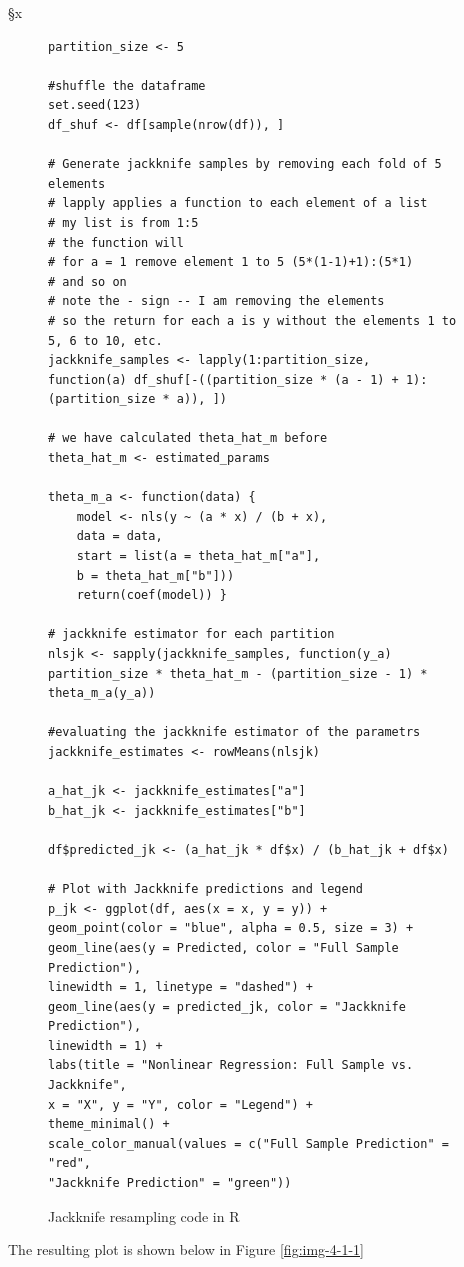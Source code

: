 §x\documentclass[]{article}
\begin{document}
\begin{figure}[H]
	\captionsetup{type=lstlisting}
	\begin{lstlisting}
partition_size <- 5

#shuffle the dataframe
set.seed(123)
df_shuf <- df[sample(nrow(df)), ]

# Generate jackknife samples by removing each fold of 5 elements
# lapply applies a function to each element of a list
# my list is from 1:5
# the function will
# for a = 1 remove element 1 to 5 (5*(1-1)+1):(5*1)
# and so on
# note the - sign -- I am removing the elements
# so the return for each a is y without the elements 1 to 5, 6 to 10, etc.
jackknife_samples <- lapply(1:partition_size,
function(a) df_shuf[-((partition_size * (a - 1) + 1):(partition_size * a)), ])

# we have calculated theta_hat_m before
theta_hat_m <- estimated_params

theta_m_a <- function(data) {
	model <- nls(y ~ (a * x) / (b + x),
	data = data,
	start = list(a = theta_hat_m["a"],
	b = theta_hat_m["b"]))
	return(coef(model)) }

# jackknife estimator for each partition
nlsjk <- sapply(jackknife_samples, function(y_a) partition_size * theta_hat_m - (partition_size - 1) * theta_m_a(y_a))

#evaluating the jackknife estimator of the parametrs
jackknife_estimates <- rowMeans(nlsjk)

a_hat_jk <- jackknife_estimates["a"]
b_hat_jk <- jackknife_estimates["b"]

df$predicted_jk <- (a_hat_jk * df$x) / (b_hat_jk + df$x)

# Plot with Jackknife predictions and legend
p_jk <- ggplot(df, aes(x = x, y = y)) +
geom_point(color = "blue", alpha = 0.5, size = 3) +
geom_line(aes(y = Predicted, color = "Full Sample Prediction"),
linewidth = 1, linetype = "dashed") +
geom_line(aes(y = predicted_jk, color = "Jackknife Prediction"),
linewidth = 1) +
labs(title = "Nonlinear Regression: Full Sample vs. Jackknife",
x = "X", y = "Y", color = "Legend") +
theme_minimal() +
scale_color_manual(values = c("Full Sample Prediction" = "red",
"Jackknife Prediction" = "green"))
	\end{lstlisting}
	\caption{Jackknife resampling code in R}
	\label{lst:jk}
\end{figure}

The resulting plot is shown below in Figure \ref{fig:img-4-1-1}
\end{document}
